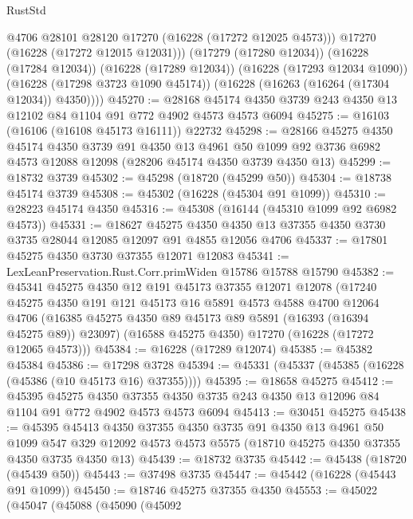 \begin{lexlean}{RustStd}
\begin{coremodule}
            @4706
            @28101
            @28120
            @17270
            (@16228 (@17272 @12025 @4573)))
          @17270
          (@16228 (@17272 @12015 @12031)))
        (@17279 (@17280 @12034))
        (@16228 (@17284 @12034))
        (@16228 (@17289 @12034))
        (@16228 (@17293 @12034 @1090))
        (@16228 (@17298 @3723 @1090 @45174))
        (@16228 (@16263 (@16264 (@17304 @12034)) @4350))))
@45270 := @28168 @45174 @4350 @3739 @243 @4350 @13 @12102 @84 @1104 @91 @772 @4902 @4573 @4573 @6094
@45275 := @16103 (@16106 (@16108 @45173 @16111)) @22732
@45298 := @28166
    @45275
    @4350
    @45174
    @4350
    @3739
    @91
    @4350
    @13
    @4961
    @50
    @1099
    @92
    @3736
    @6982
    @4573
    @12088
    @12098
    (@28206 @45174 @4350 @3739 @4350 @13)
@45299 := @18732 @3739
@45302 := @45298 (@18720 (@45299 @50))
@45304 := @18738 @45174 @3739
@45308 := @45302 (@16228 (@45304 @91 @1099))
@45310 := @28223 @45174 @4350
@45316 := @45308 (@16144 (@45310 @1099 @92 @6982 @4573))
@45331 := @18627
    @45275
    @4350
    @4350
    @13
    @37355
    @4350
    @3730
    @3735
    @28044
    @12085
    @12097
    @91
    @4855
    @12056
    @4706
@45337 := @17801 @45275 @4350 @3730 @37355 @12071 @12083
@45341 := LexLeanPreservation.Rust.Corr.primWiden @15786 @15788 @15790
@45382 := @45341
    @45275
    @4350
    @12
    @191
    @45173
    @37355
    @12071
    @12078
    (@17240
      @45275
      @4350
      @191
      @121
      @45173
      @16
      @5891
      @4573
      @4588
      @4700
      @12064
      @4706
      (@16385 @45275 @4350 @89 @45173 @89 @5891 (@16393 (@16394 @45275 @89)) @23097)
      (@16588 @45275 @4350)
      @17270
      (@16228 (@17272 @12065 @4573)))
@45384 := @16228 (@17289 @12074)
@45385 := @45382 @45384
@45386 := @17298 @3728
@45394 := @45331 (@45337 (@45385 (@16228 (@45386 (@10 @45173 @16) @37355))))
@45395 := @18658 @45275
@45412 := @45395
    @45275
    @4350
    @37355
    @4350
    @3735
    @243
    @4350
    @13
    @12096
    @84
    @1104
    @91
    @772
    @4902
    @4573
    @4573
    @6094
@45413 := @30451 @45275
@45438 := @45395
    @45413
    @4350
    @37355
    @4350
    @3735
    @91
    @4350
    @13
    @4961
    @50
    @1099
    @547
    @329
    @12092
    @4573
    @4573
    @5575
    (@18710 @45275 @4350 @37355 @4350 @3735 @4350 @13)
@45439 := @18732 @3735
@45442 := @45438 (@18720 (@45439 @50))
@45443 := @37498 @3735
@45447 := @45442 (@16228 (@45443 @91 @1099))
@45450 := @18746 @45275 @37355 @4350
@45553 := @45022
    (@45047
      (@45088
        (@45090
          (@45092

\end{coremodule}
\end{lexlean}
